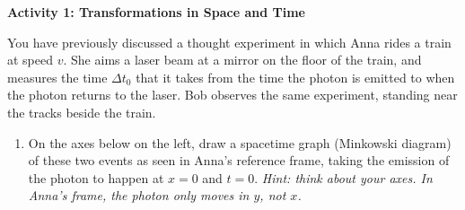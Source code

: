 \bigskip

\textbf{Activity 1: Transformations in Space and Time}

You have previously discussed a thought experiment in which Anna rides a train at speed $v$.  She aims a laser beam at a mirror on the floor of the train, and measures the time $\Delta t_0$ that it takes from the time the photon is 
emitted to when the photon returns to the laser.  Bob observes the same experiment, standing near the tracks beside the train.  

\begin{enumerate}[labparts]

\item  
On the axes below on the left, draw a spacetime graph (Minkowski diagram) of these two events as seen in Anna's reference frame, taking the emission of the photon to happen at $x=0$ and $t=0$.  \textit{Hint: think about your axes.  In Anna's frame, the photon only moves in $y$, not $x$.}
\end{enumerate}


